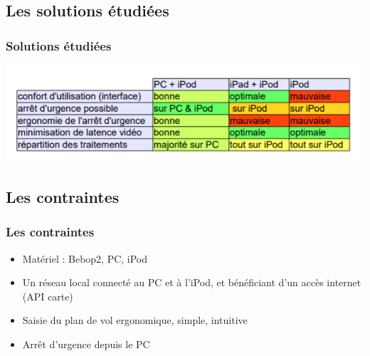 \documentclass{beamer}
\begin{document}
	\begin{frame}
	\section{Les solutions étudiées}
		\begin{center}
		\frametitle{Solutions étudiées}
            \includegraphics[scale=0.9]{comparatif.PNG}
		\end{center}
	\end{frame}
	\begin{frame}
	\section{Les contraintes}
		\begin{center}
		\frametitle{Les contraintes}
           	\begin{itemize}
                \item Matériel : Bebop2, PC, iPod
                \item Un réseau local connecté au PC et à l'iPod, et bénéficiant d'un accès internet (API carte)
                \item Saisie du plan de vol ergonomique, simple, intuitive
                \item Arrêt d'urgence depuis le PC
            \end{itemize}
		\end{center}
	\end{frame}
\end{document}
